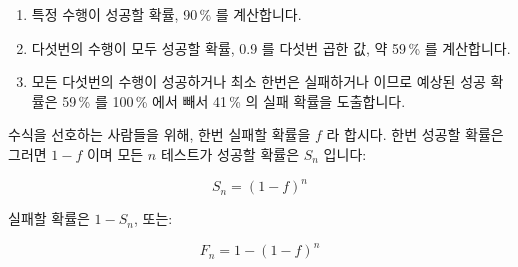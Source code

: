 \fi

\begin{enumerate}
\item	특정 수행이 성공할 확률, 90\,\% 를 계산합니다.
\item	다섯번의 수행이 모두 성공할 확률, 0.9 를 다섯번 곱한 값, 약 59\,\% 를
	계산합니다.
\item	모든 다섯번의 수행이 성공하거나 최소 한번은 실패하거나 이므로 예상된
	성공 확률은 59\,\% 를 100\,\% 에서 빼서 41\,\% 의 실패 확률을
	도출합니다.

\end{enumerate}

수식을 선호하는 사람들을 위해, 한번 실패할 확률을 $f$ 라 합시다.
한번 성공할 확률은 그러면 $1-f$ 이며 모든 $n$ 테스트가 성공할 확률은 $S_n$
입니다:

\begin{equation}
	S_n = \left(1-f\right)^n
\end{equation}

실패할 확률은 $1-S_n$, 또는:

\begin{equation}
	F_n = 1-\left(1-f\right)^n
\label{eq:debugging:Binomial Failure Rate}
\end{equation}

